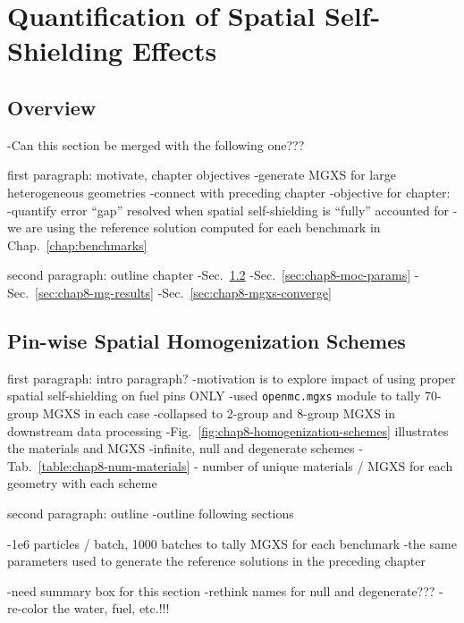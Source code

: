 \chapter{Quantification of Spatial Self-Shielding Effects}
\label{chap:quantify}


\section{Overview}
\label{sec:chap8-overview}

-Can this section be merged with the following one???

first paragraph: motivate, chapter objectives
-generate MGXS for large heterogeneous geometries
-connect with preceding chapter
-objective for chapter:
  -quantify error ``gap'' resolved when spatial self-shielding is ``fully'' accounted for
  -we are using the reference solution computed for each benchmark in Chap.~\ref{chap:benchmarks}

second paragraph: outline chapter
-Sec.~\ref{sec:chap8-pinwise-space-homogenize}
-Sec.~\ref{sec:chap8-moc-params}
-Sec.~\ref{sec:chap8-mg-results}
-Sec.~\ref{sec:chap8-mgxs-converge}


\section{Pin-wise Spatial Homogenization Schemes}
\label{sec:chap8-pinwise-space-homogenize}

first paragraph: intro paragraph?
-motivation is to explore impact of using proper spatial self-shielding on fuel pins ONLY
-used \texttt{openmc.mgxs} module to tally 70-group \ac{MGXS} in each case
  -collapsed to 2-group and 8-group \ac{MGXS} in downstream data processing
-Fig.~\ref{fig:chap8-homogenization-schemes} illustrates the materials and \ac{MGXS}
  -infinite, null and degenerate schemes
-Tab.~\ref{table:chap8-num-materials} - number of unique materials / \ac{MGXS} for each geometry with each scheme

second paragraph: outline
-outline following sections

-1e6 particles / batch, 1000 batches to tally \ac{MGXS} for each benchmark
  -the same parameters used to generate the reference solutions in the preceding chapter

-need summary box for this section
-rethink names for null and degenerate???
-re-color the water, fuel, etc.!!!

